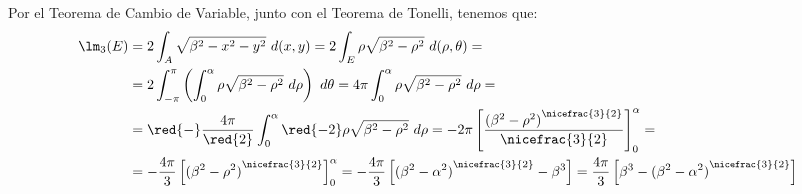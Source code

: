 \begin{ejercicio}
    Por el Teorema de Cambio de Variable, junto con el Teorema de Tonelli, tenemos que:
    \begin{align*}
        \lm_3(E) &= 2\int_{A} \sqrt{\beta^2 - x^2 - y^2}~d(x, y) = 2\int_{E} \rho\sqrt{\beta^2 - \rho^2}~d(\rho, \theta) =\\
        &= 2\int_{-\pi}^\pi \left( \int_0^\alpha \rho\sqrt{\beta^2 - \rho^2}~d\rho \right)~d\theta = 4\pi \int_0^\alpha \rho\sqrt{\beta^2 - \rho^2}~d\rho =\\
        &= \red{-} \dfrac{4\pi}{\red{2}} \int_0^\alpha \red{-2}\rho\sqrt{\beta^2 - \rho^2}~d\rho =
        -2\pi\left[ \dfrac{{(\beta^2-\rho^2)}^{\nicefrac{3}{2}}}{\nicefrac{3}{2}} \right]_0^\alpha =\\
        &= -\dfrac{4\pi}{3} \left[ {(\beta^2-\rho^2)}^{\nicefrac{3}{2}}\right]_0^\alpha
        = -\dfrac{4\pi}{3} \left[ {(\beta^2-\alpha^2)}^{\nicefrac{3}{2}} - \beta^3 \right]
        = \dfrac{4\pi}{3} \left[ \beta^3 - {(\beta^2-\alpha^2)}^{\nicefrac{3}{2}} \right]
    \end{align*}
\end{ejercicio}



